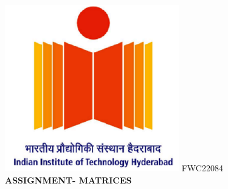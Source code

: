 \documentclass[12pt,a4paper]{report}
\begin{document}
\raggedright{\includegraphics[scale=0.8]{iith.png}} \hspace{12cm}\raggedleft FWC22084\vspace{8mm}\\ 
 \centering \Large \textbf{ASSIGNMENT- MATRICES} \normalsize \vspace{15mm}
\end{document}
